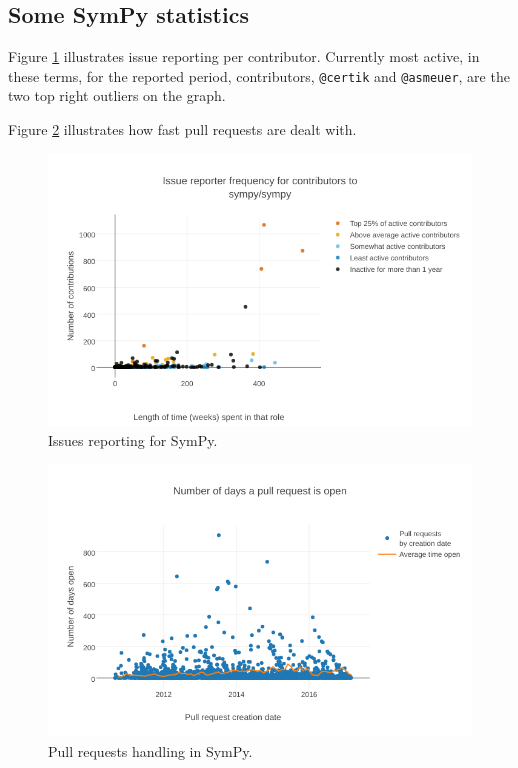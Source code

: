 \documentclass{deliverablereport}
\begin{document}
\subsection*{Some SymPy statistics}
Figure \ref{wp7:fig:sympyissues} illustrates issue reporting
per contributor.
Currently most active, in these terms,
for the reported period, contributors, {\tt @certik} and {\tt @asmeuer}, 
are the two top right outliers on the graph. 

Figure \ref{wp7:fig:sympypulls} illustrates how fast pull
requests are dealt with.

\begin{figure}[ht]
  \includegraphics[width=\textwidth]{sympy-issuereporting}
    \caption{Issues reporting for SymPy. 
    \label{wp7:fig:sympyissues}}
\end{figure}

\begin{figure}[ht]
  \includegraphics[width=\textwidth]{sympy-pullrequests}
    \caption{Pull requests handling in SymPy.\label{wp7:fig:sympypulls}}
\end{figure}

\newpage

\printbibliography
\end{document}
